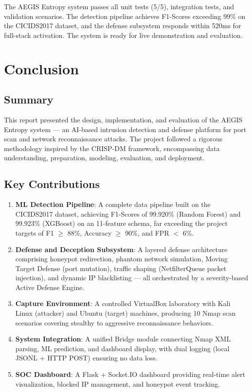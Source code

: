 \documentclass[12pt,a4paper]{report}
\begin{document}
The AEGIS Entropy system passes all unit tests (5/5), integration tests, and validation scenarios. The detection pipeline achieves F1-Scores exceeding 99\% on the CICIDS2017 dataset, and the defense subsystem responds within 520ms for full-stack activation. The system is ready for live demonstration and evaluation.

\chapter{Conclusion}\label{ch:conclusion}

\section{Summary}

This report presented the design, implementation, and evaluation of the AEGIS Entropy system --- an AI-based intrusion detection and defense platform for port scan and network reconnaissance attacks. The project followed a rigorous methodology inspired by the CRISP-DM framework, encompassing data understanding, preparation, modeling, evaluation, and deployment.

\section{Key Contributions}

\begin{enumerate}
    \item \textbf{ML Detection Pipeline}: A complete data pipeline built on the CICIDS2017 dataset, achieving F1-Scores of 99.920\% (Random Forest) and 99.923\% (XGBoost) on an 11-feature schema, far exceeding the project targets of F1 $\geq$ 88\%, Accuracy $\geq$ 90\%, and FPR $<$ 6\%.

    \item \textbf{Defense and Deception Subsystem}: A layered defense architecture comprising honeypot redirection, phantom network simulation, Moving Target Defense (port mutation), traffic shaping (NetfilterQueue packet injection), and dynamic IP blacklisting --- all orchestrated by a severity-based Active Defense Engine.

    \item \textbf{Capture Environment}: A controlled VirtualBox laboratory with Kali Linux (attacker) and Ubuntu (target) machines, producing 10 Nmap scan scenarios covering stealthy to aggressive reconnaissance behaviors.

    \item \textbf{System Integration}: A unified Bridge module connecting Nmap XML parsing, ML prediction, and dashboard display, with dual logging (local JSONL + HTTP POST) ensuring no data loss.

    \item \textbf{SOC Dashboard}: A Flask + Socket.IO dashboard providing real-time alert visualization, blocked IP management, and honeypot event tracking.
\end{enumerate}
\end{document}
